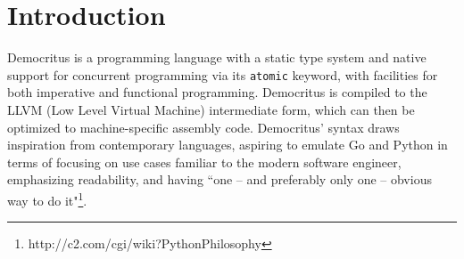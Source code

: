 \chapter{Introduction}

Democritus is a programming language with a static type system and native support for concurrent programming via its \texttt{atomic} keyword, with facilities for both imperative and functional programming. Democritus is compiled to the LLVM (Low Level Virtual Machine) intermediate form, which can then be optimized to machine-specific assembly code. Democritus' syntax draws inspiration from contemporary languages, aspiring to emulate Go and Python in terms of focusing on use cases familiar to the modern software engineer, emphasizing readability, and having ``one -- and preferably only one -- obvious way to do it"\footnote[1]{http://c2.com/cgi/wiki?PythonPhilosophy}.
